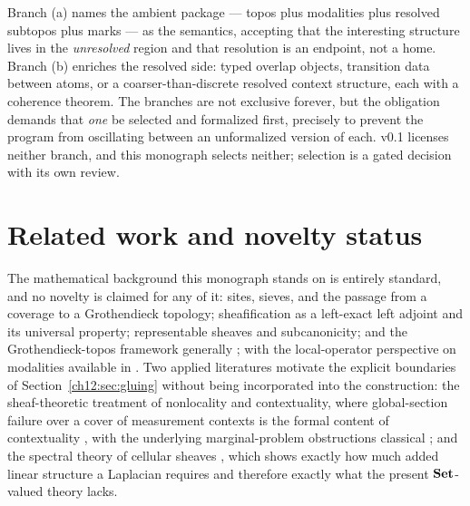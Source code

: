 \begin{remark}
\label{ch12:rem:branches}
Branch (a) names the ambient package --- topos plus modalities plus
resolved subtopos plus marks --- as the semantics, accepting that the
interesting structure lives in the \emph{unresolved} region and that
resolution is an endpoint, not a home. Branch (b) enriches the resolved
side: typed overlap objects, transition data between atoms, or a
coarser-than-discrete resolved context structure, each with a coherence
theorem. The branches are not exclusive forever, but the obligation demands
that \emph{one} be selected and formalized first, precisely to prevent the
program from oscillating between an unformalized version of each. v0.1
licenses neither branch, and this monograph selects neither; selection is a
gated decision with its own review.
\end{remark}

\section{Related work and novelty status}
\label{ch12:sec:related}

The mathematical background this monograph stands on is entirely standard,
and no novelty is claimed for any of it: sites, sieves, and the passage
from a coverage to a Grothendieck topology; sheafification as a left-exact
left adjoint and its universal property; representable sheaves and
subcanonicity; and the Grothendieck-topos framework generally
\cite{maclane, stacks00ZC, stacks00W1, stacks00WO}; with the local-operator
perspective on modalities available in \cite{johnstone}. Two applied
literatures motivate the explicit boundaries of
Section~\ref{ch12:sec:gluing} without being incorporated into the
construction: the sheaf-theoretic treatment of nonlocality and
contextuality, where global-section failure over a cover of measurement
contexts is the formal content of contextuality
\cite{abramskybrandenburger}, with the underlying marginal-problem
obstructions classical \cite{vorobev}; and the spectral theory of cellular
sheaves \cite{hansenghrist}, which shows exactly how much added linear
structure a Laplacian requires and therefore exactly what the present
$\mathbf{Set}$-valued theory lacks.

